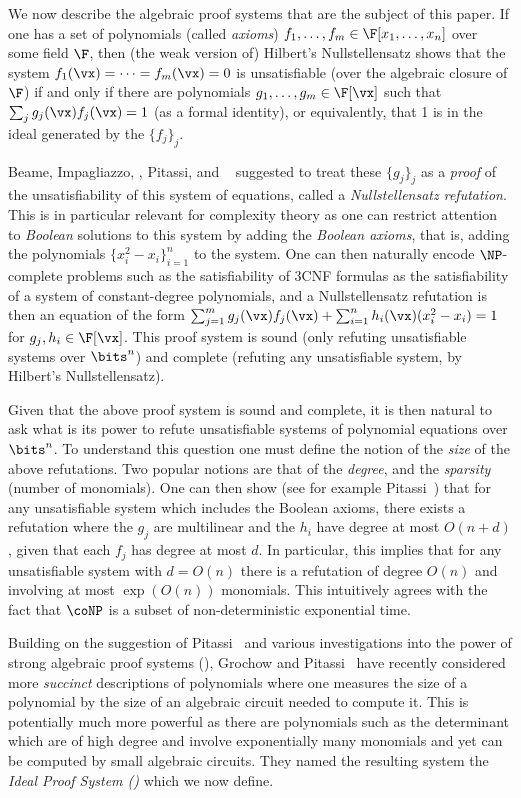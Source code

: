 \documentclass{toc}
\begin{document}
We now describe the algebraic proof systems that are the subject of this paper.  If one has a set of polynomials (called \emph{axioms}) $f_1,\ldots,f_m\in\F[x_1,\ldots,x_n]$ over some field $\F$, then (the weak version of) Hilbert's Nullstellensatz shows that the system $f_1(\vx)=\cdots=f_m(\vx)=0$ is unsatisfiable (over the algebraic closure of $\F$) if and only if there are polynomials $g_1,\ldots,g_m\in\F[\vx]$ such that $\sum_j g_j(\vx)f_j(\vx)=1$ (as a formal identity), or equivalently, that 1 is in the ideal generated by the $\{f_j\}_j$.

Beame, Impagliazzo, \Krajicek, Pitassi, and \Pudlak~\cite{BeameIKPP96} suggested to treat these $\{g_j\}_j$ as a \emph{proof} of the unsatisfiability of this system of equations, called a \emph{Nullstellensatz refutation}.  This is in particular relevant for complexity theory as one can restrict attention to \emph{Boolean} solutions to this system by adding the \emph{Boolean axioms}, that is, adding the polynomials $\{x_i^2-x_i\}_{i=1}^n$ to the system.
One can then naturally encode $\NP$-complete problems such as the satisfiability of 3CNF formulas as the satisfiability of a system of constant-degree polynomials, and a Nullstellensatz refutation is then an equation of the form $\sum_{j=1}^m g_j(\vx)f_j(\vx)+\sum_{i=1}^n h_i(\vx)(x_i^2-x_i)=1$ for $g_j,h_i\in\F[\vx]$.  This proof system is sound (only refuting unsatisfiable systems over $\bits^n$) and complete (refuting any unsatisfiable system, by Hilbert's Nullstellensatz).

Given that the above proof system is sound and complete, it is then natural to ask what is its power to refute unsatisfiable systems of polynomial equations over $\bits^n$.  To understand this question one must define the notion of the \emph{size} of the above refutations.  Two popular notions are that of the \emph{degree}, and the \emph{sparsity} (number of monomials). One can then show (see for example Pitassi~\cite{Pitassi97}) that for any unsatisfiable system which includes the Boolean axioms, there exists a refutation
where the $g_j$ are multilinear and  the $h_i$ have degree at most $O(n+d)$, given that each $f_j$ has degree at most $d$.  In particular, this implies that for any unsatisfiable system with $d=O(n)$ there is a refutation of degree $O(n)$ and involving at most $\exp(O(n))$ monomials.  This intuitively agrees with the fact that $\coNP$ is a subset of non-deterministic exponential time.

Building on the suggestion of Pitassi~\cite{Pitassi97} and various investigations into the power of strong algebraic proof systems (\cite{GrigorievHirsch03,RazTzameret08a,RazTzameret08b}), Grochow and Pitassi~\cite{DBLP:journals/jacm/GrochowP18} have recently considered more \emph{succinct} descriptions of polynomials where one measures the size of a polynomial by the size of an algebraic circuit needed to compute it.  This is potentially much more powerful as there are polynomials such as the determinant which are of high degree and involve exponentially many monomials and yet can be computed by small algebraic circuits. They named the resulting system the \emph{Ideal Proof System (\IPS)} which we now define.
\end{document}
